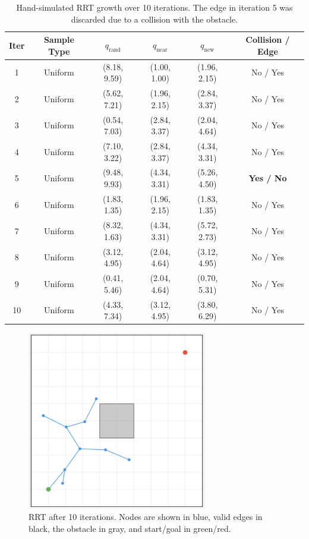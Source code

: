 \documentclass[11pt]{article}
\begin{document}
\begin{table}[H]
\centering
\renewcommand{\arraystretch}{1.15}
\setlength{\tabcolsep}{6pt}
\begin{tabular}{c c c c c c}
\toprule
\textbf{Iter} & \textbf{Sample Type} & \textbf{$q_{\text{rand}}$} & \textbf{$q_{\text{near}}$} & \textbf{$q_{\text{new}}$} & \textbf{Collision / Edge} \\
\midrule
1 & Uniform & (8.18, 9.59) & (1.00, 1.00) & (1.96, 2.15) & No / Yes \\
2 & Uniform & (5.62, 7.21) & (1.96, 2.15) & (2.84, 3.37) & No / Yes \\
3 & Uniform & (0.54, 7.03) & (2.84, 3.37) & (2.04, 4.64) & No / Yes \\
4 & Uniform & (7.10, 3.22) & (2.84, 3.37) & (4.34, 3.31) & No / Yes \\
\rowcolor{red!10}
5 & Uniform & (9.48, 9.93) & (4.34, 3.31) & (5.26, 4.50) & \textbf{Yes / No} \\
6 & Uniform & (1.83, 1.35) & (1.96, 2.15) & (1.83, 1.35) & No / Yes \\
7 & Uniform & (8.32, 1.63) & (4.34, 3.31) & (5.72, 2.73) & No / Yes \\
8 & Uniform & (3.12, 4.95) & (2.04, 4.64) & (3.12, 4.95) & No / Yes \\
9 & Uniform & (0.41, 5.46) & (2.04, 4.64) & (0.70, 5.31) & No / Yes \\
10 & Uniform & (4.33, 7.34) & (3.12, 4.95) & (3.80, 6.29) & No / Yes \\
\bottomrule
\end{tabular}
\caption{Hand-simulated RRT growth over 10 iterations. The edge in iteration 5 was discarded due to a collision with the obstacle.}
\label{tab:rrt_growth}
\end{table}

\begin{figure}[h]
    \centering
    \includegraphics[width=0.7\textwidth]{rrt_growth.png}
    \caption{RRT after 10 iterations. Nodes are shown in blue, valid edges in black, the obstacle in gray, and start/goal in green/red.}
    \label{fig:rrt_growth}
\end{figure}
\end{document}
